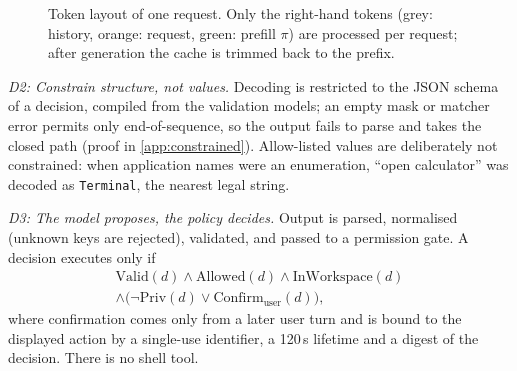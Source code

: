 \documentclass[journal]{IEEEtran}
\theoremstyle{definition}
\begin{document}
\begin{figure}[t]
\centering
{}
\caption{Token layout of one request. Only the right-hand tokens (grey: history, orange: request, green: prefill $\pi$) are processed per request; after generation the cache is trimmed back to the prefix.}
\label{fig:prompt}
\end{figure}

\emph{D2: Constrain structure, not values.} Decoding is restricted to the JSON schema of a decision,
compiled from the validation models; an empty mask or matcher error permits only end-of-sequence, so
the output fails to parse and takes the closed path (proof in \cref{app:constrained}). Allow-listed
values are deliberately not constrained: when application names were an enumeration, ``open
calculator'' was decoded as \texttt{Terminal}, the nearest legal string.

\emph{D3: The model proposes, the policy decides.} Output is parsed, normalised (unknown keys are
rejected), validated, and passed to a permission gate. A decision executes only if
\begin{multline*}
\mathrm{Valid}(d)\wedge\mathrm{Allowed}(d)\wedge\mathrm{InWorkspace}(d)\\
\wedge\big(\neg\mathrm{Priv}(d)\vee\mathrm{Confirm}_{\text{user}}(d)\big),
\end{multline*}
where confirmation comes only from a later user turn and is bound to the displayed action by a
single-use identifier, a 120\,s lifetime and a digest of the decision. There is no shell tool.
\end{document}
